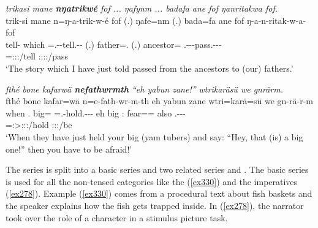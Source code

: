 \begin{exe}
	\ex \emph{trikasi mane \textbf{nŋatrikwé} fof ... ŋafynm ... badafa ane fof ŋanritakwa fof.}\\
	\glll trik-si mane n=ŋ-a-trik-w-é fof (.) ŋafe=nm (.) bada=fa ane fof ŋ-a-n-ritak-w-a-\Zero{} fof\\
	tell-\Nmlz{} which \Immpst=\M.\Alph-\Vc-tell.\Ext-\Ndu-\Fsg{} \Emph{} (.) father=\Dat.\Nsg{} (.) ancestor=\Abl{} \Dem{} \Emph{} \M.\Alph-\Vc-\Venit-pass.\Ext-\Ndu-\Pst-\Sg{} \Emph{}\\
	{} {} \footnotesize{\Immpst=\Fsg:\Sbj:\Nonpast:\Ipfv/tell} {} {} {} {} {} {} {} \footnotesize{\Stsg:\Sbj:\Pst:\Ipfv:\Venit/pass} {}\\
	\trans `The story which I have just told passed from the ancestors to (our) fathers.'\\ 
	\label{ex273}
\end{exe}
\begin{exe}
	\ex \emph{fthé bone kafarwä \textbf{nefathwrmth} ``eh yabun zane!'' wtrikaräsü we gnrärm.}\\
	\glll fthé bone kafar=wä n=e-fath-wr-m-th eh yabun zane wtri=karä=sü we gn-rä-r-m\\
	when \Ssg.\Poss{} big=\Emph{} \Immpst=\Stnsg.\Alph-hold.\Ext-\Ndu-\Dur-\Stnsg{} eh big \Dem:\Prox{} fear=\Prop=\Etc{} also \Ssg.\Bet-\Cop-\Ndu-\Dur{}\\
	{} {} {} \footnotesize{\Immpst=\Stpl:\Sbj>\Stpl:\Obj:\Nonpast:\Dur/hold} {} {} {} {} {} \footnotesize{\Ssg:\Sbj:\Futimp:\Ipfv/be}\\
	\trans `When they have just held your big (yam tubers) and say: ``Hey, that (is) a big one!'' then you have to be afraid!' 
	\label{ex274}
\end{exe}

The \Bet{} series is split into a basic series \Bet{} and two related series \Betaone{} and \Betatwo. The basic \Bet{} series is used for all the non-tensed categories like the  (\ref{ex330}) and the imperatives (\ref{ex278}). Example (\ref{ex330}) comes from a procedural text about fish baskets and the speaker explains how the fish gets trapped inside. In (\ref{ex278}), the narrator took over the role of a character in a stimulus picture task.

